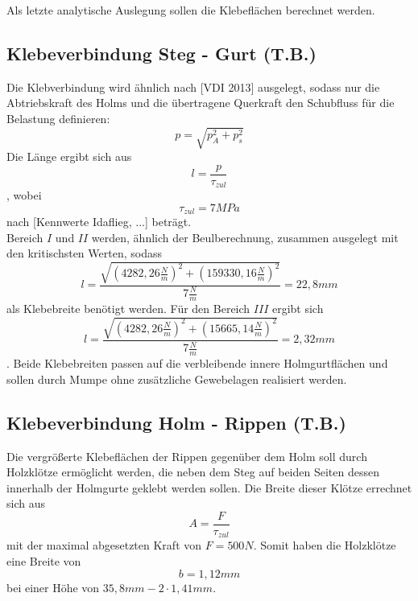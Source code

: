 Als letzte analytische Auslegung sollen die Klebeflächen berechnet werden.
\subsection{Klebeverbindung Steg - Gurt (T.B.)}
Die Klebverbindung wird ähnlich nach [VDI 2013]  ausgelegt, sodass nur die Abtriebskraft des Holms und die übertragene Querkraft den Schubfluss für die Belastung definieren:
\begin{equation}
	p=\sqrt{p_{A}^{2}+p_{s}^{2}}
\end{equation}
Die Länge ergibt sich aus 
\begin{equation}
	l=\frac{p}{\tau_{zul}}
\end{equation}
, wobei 
\begin{equation}
	\tau_{zul}=7MPa
\end{equation}
nach [Kennwerte Idaflieg, ...] beträgt.\\

\noindent Bereich $I$ und $II$ werden, ähnlich der Beulberechnung, zusammen ausgelegt mit den kritischsten Werten, sodass 
\begin{equation}
	l=\frac{\sqrt{(4282,26\frac{N}{m})^{2}+(159330,16\frac{N}{m})^{2}}}{7\frac{N}{m}}=22,8mm
\end{equation}
als Klebebreite benötigt werden. Für den Bereich $III$ ergibt sich
\begin{equation}
	l=\frac{\sqrt{(4282,26\frac{N}{m})^{2}+(15665,14\frac{N}{m})^{2}}}{7\frac{N}{m}}=2,32mm
\end{equation}
. Beide Klebebreiten passen auf die verbleibende innere Holmgurtflächen und sollen durch Mumpe ohne zusätzliche Gewebelagen realisiert werden.

\subsection{Klebeverbindung Holm - Rippen (T.B.)}
Die vergrößerte Klebeflächen der Rippen gegenüber dem Holm soll durch Holzklötze ermöglicht werden, die neben dem Steg auf beiden Seiten dessen innerhalb der Holmgurte geklebt werden sollen. Die Breite dieser Klötze errechnet sich aus 
\begin{equation}
	A=\frac{F}{\tau_{zul}}
\end{equation}
mit der maximal abgesetzten Kraft von $F=500N$.
Somit haben die Holzklötze eine Breite von 
\begin{equation}
	b=1,12mm
\end{equation}
bei einer Höhe von $35,8mm-2\cdot 1,41mm$.